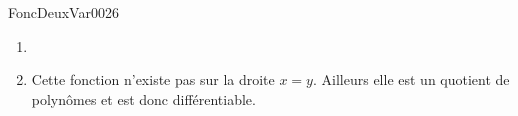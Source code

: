 
\begin{corrige}{FoncDeuxVar0026}

	\begin{enumerate}

		\item
		\item
			
			Cette fonction n'existe pas sur la droite $x=y$. Ailleurs elle est un quotient de polynômes et est donc différentiable.

	\end{enumerate}

\end{corrige}
